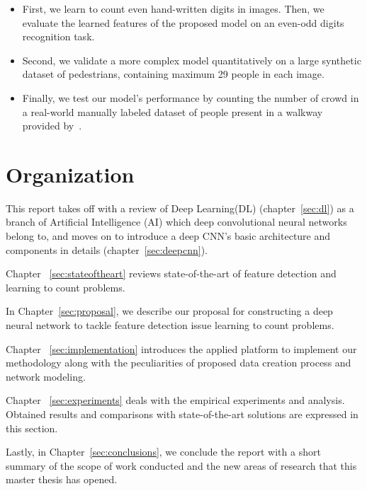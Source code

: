 \begin{enumerate}
	\begin{itemize}
		\item First, we learn to count even hand-written digits in images. Then, we evaluate the learned features of the proposed model on an even-odd digits recognition task. 
		\item Second, we validate a more complex model  quantitatively on a large synthetic dataset of pedestrians, containing maximum 29 people in each image. 
		\item Finally, we test our model's performance by counting the number of crowd in a real-world manually labeled dataset of people present in a walkway provided by~\citealt*{chan2013ground}. 
	\end{itemize}
	
\end{enumerate}

\section{Organization}

This report takes off with a review of Deep Learning(DL) (chapter~\ref{sec:dl}) as a branch of Artificial Intelligence (AI) which deep convolutional neural networks belong to, and moves on to introduce a deep CNN's basic architecture and components in details (chapter~\ref{sec:deepcnn}). 


Chapter ~\ref{sec:stateoftheart} reviews state-of-the-art of feature detection and learning to count problems. 

In Chapter~\ref{sec:proposal}, we describe our proposal for constructing a deep neural network to tackle feature detection issue learning to count problems. 

Chapter ~\ref{sec:implementation} introduces the applied platform to implement our methodology  along with the peculiarities of proposed data creation process and network modeling. 

Chapter ~\ref{sec:experiments} deals with the empirical experiments and analysis. Obtained results and comparisons with state-of-the-art solutions are expressed in this section.

Lastly, in Chapter~\ref{sec:conclusions}, we conclude the report with a short summary of the scope of work conducted and the new areas of research that this master thesis has opened.
